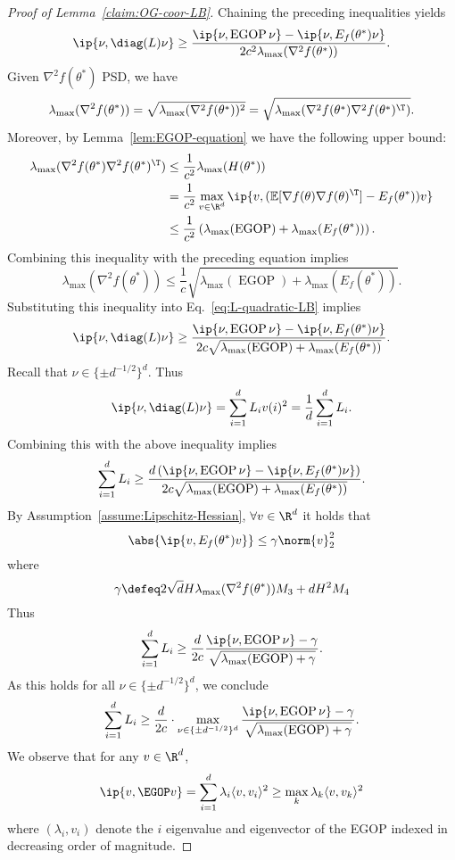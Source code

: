 \begin{proof}[Proof of Lemma~\ref{claim:OG-coor-LB}]
    Chaining the preceding inequalities yields
    \begin{equation}\label{eq:L-quadratic-LB}
        \ip{\nu, \diag(L) \nu} \geq \frac{\ip{\nu,\operatorname{EGOP}\nu} - \ip{\nu,E_f(\theta^*) \nu}}{2 c^2 \lambda_{\max}(\nabla^2 f(\theta^*))}.
    \end{equation}
    Given $\nabla^2 f(\theta^*)$ PSD, we have
    \[
        \lambda_{\max}(\nabla^2 f(\theta^*)) = \sqrt{\lambda_{\max}(\nabla^2 f(\theta^*))^2} = \sqrt{\lambda_{\max}(\nabla^2 f(\theta^*)\nabla^2 f(\theta^*)^\T)}.
    \]
    Moreover, by Lemma~\ref{lem:EGOP-equation} we have the following upper bound:
    \begin{align*}
        \lambda_{\max}(\nabla^2 f(\theta^*)\nabla^2 f(\theta^*)^\T) &\leq \frac{1}{c^2}\lambda_{\max}(H(\theta^*))\\
        &= \frac{1}{c^2} \max_{v\in \R^d} \ip{v, (\mathbb{E}[\nabla f(\theta)\nabla f(\theta)^\T] - E_f(\theta^*)) v}\\
        &\leq \frac{1}{c^2}\left(\lambda_{\max}(\operatorname{EGOP}) + \lambda_{\max}(E_f(\theta^*))\right).
    \end{align*}
    Combining this inequality with the preceding equation implies
    \[
        \lambda_{\max}(\nabla^2 f(\theta^*)) \leq \frac{1}{c}\sqrt{\lambda_{\max}(\operatorname{EGOP}) + \lambda_{\max}(E_f(\theta^*))}.
    \]
    Substituting this inequality into Eq.~\ref{eq:L-quadratic-LB} implies
    \[
        \ip{\nu, \diag(L) \nu} \geq \frac{\ip{\nu,\operatorname{EGOP}\nu} - \ip{\nu, E_f(\theta^*)\nu}}{2 c \sqrt{\lambda_{\max}(\operatorname{EGOP}) + \lambda_{\max}(E_f(\theta^*))}}.
    \]
    Recall that $\nu \in \{\pm d^{-1/2}\}^d$. Thus
    \[
        \ip{\nu, \diag(L) \nu} = \sum_{i=1}^d L_i v(i)^2 = \frac{1}{d}\sum_{i=1}^d L_i.
    \]
    Combining this with the above inequality implies
    \[
        \sum_{i=1}^d L_i \geq \frac{d\left(\ip{\nu,\operatorname{EGOP}\nu} - \ip{\nu, E_f(\theta^*)\nu}\right)}{2 c \sqrt{\lambda_{\max}(\operatorname{EGOP}) + \lambda_{\max}(E_f(\theta^*))}}.
    \]
    By Assumption~\ref{assume:Lipschitz-Hessian}, $\forall v\in \R^d$ it holds that
    \[
        \abs{\ip{v, E_f(\theta^*) v}} \leq \gamma \norm{v}^2_2
    \]
    where
    \[
        \gamma \defeq  2\sqrt{d}H \lambda_{\max}(\nabla^2 f(\theta^*)) M_3 + dH^2 M_4
    \]
    Thus
    \[
        \sum_{i=1}^d L_i \geq \frac{d}{2c}\frac{\ip{\nu,\operatorname{EGOP}\nu} - \gamma}{\sqrt{\lambda_{\max}(\operatorname{EGOP}) + \gamma}}.
    \]
    As this holds for all $\nu\in \{\pm d^{-1/2}\}^d$, we conclude 
    \[
        \sum_{i=1}^d L_i \geq \frac{d}{2c}\cdot \max_{\nu\in \{\pm d^{-1/2}\}^d}\frac{\ip{\nu,\operatorname{EGOP}\nu} - \gamma}{\sqrt{\lambda_{\max}(\operatorname{EGOP}) + \gamma}}.
    \]
    We observe that for any $v\in \R^d$,
    \[
        \ip{v, \EGOP v} = \sum_{i=1}^d \lambda_i \langle v, v_i\rangle^2 \geq \max_{k} \lambda_{k} \langle v, v_k\rangle^2
    \]
    where $(\lambda_i, v_i)$ denote the $i$ eigenvalue and eigenvector of the EGOP indexed in decreasing order of magnitude. 
    

\end{proof}
